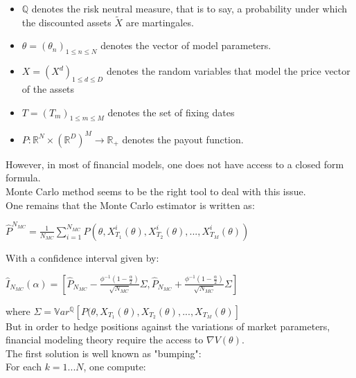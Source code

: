 \documentclass {article}
\begin{document}
		\begin{itemize}
			\item $\mathbb{Q}$ denotes the risk neutral measure, that is to say, a probability under which the discounted assets $\tilde X$ are martingales.
			\item $\theta = (\theta_{n})_{1 \leq n \leq N}$ denotes the vector of model parameters.
			\item $X = (X^{d})_{1 \leq d \leq D}$ denotes the random variables that model the price vector of the assets
			\item $T = (T_{m})_{1 \leq m \leq M}$ denotes the set of fixing dates
			\item $P: \mathbb{R}^{N} \times (\mathbb{R}^{D})^{M} \longrightarrow \mathbb{R}_{+}$ denotes the payout function.
		\end{itemize}
		
		However, in most of financial models, one does not have access to a closed form formula. \\
		Monte Carlo method seems to be the right tool to deal with this issue. \\
		One remains that the Monte Carlo estimator is written as: \\
		
		\begin{center}
			$\hat P^{N_{MC}} = \frac{1}{N_{MC}} \sum_{i=1}^{N_{MC}}{P (\theta, X_{T_{1}}^{i}(\theta), X_{T_{2}}^{i}(\theta), ..., X_{T_{M}}^{i}(\theta))}$
		\end{center}
		
		With a confidence interval given by:
		
		\begin{center}
			$\hat I_{N_{MC}}(\alpha) = \left[ \hat P_{N_{MC}} - \frac{\phi^{-1}(1-\frac{\alpha}{2})}{\sqrt{N_{MC}}} \Sigma, \hat P_{N_{MC}} + \frac{\phi^{-1}(1-\frac{\alpha}{2})}{\sqrt{N_{MC}}} \Sigma \right]$
		\end{center}
		
		where $\Sigma = \mathbb{V}ar^{\mathbb{Q}} \left[ P (\theta, X_{T_{1}}(\theta), X_{T_{2}}(\theta), ..., X_{T_{M}}(\theta) \right]$ \\
		
		But in order to hedge positions against the variations of market parameters, financial modeling theory require the access 
		to $\nabla{V} (\theta)$. \\
		
		The first solution is well known as "bumping": \\
		For each $k = 1 ... N$, one compute: 
			
\end{document}
